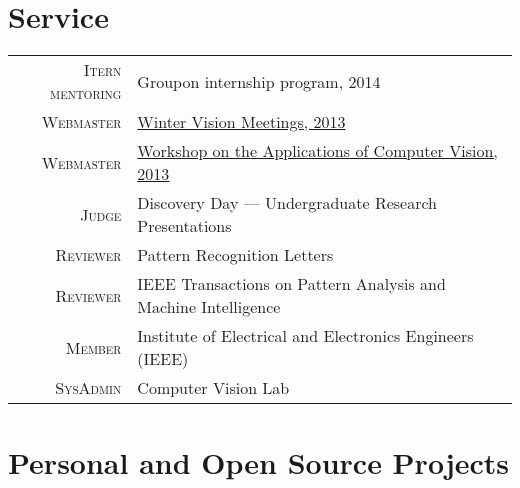 \documentclass[10pt]{article}
\begin{document}
\section{Service}
\vspace{-1em}
\newcommand{\service}[2]{
  \textsc{#1} & #2\\
}
\begin{longtable}{r|p{10cm}}
  \service{Itern mentoring}{Groupon internship program, 2014}
  \service{Webmaster}{\href{http://cvl.cse.sc.edu/wvm2013/}{Winter Vision Meetings, 2013}}
  \service{Webmaster}{\href{http://cvl.cse.sc.edu/wacv2013/}{Workshop on the Applications of Computer Vision, 2013}}
  \service{Judge}{Discovery Day --- Undergraduate Research Presentations}
  \service{Reviewer}{Pattern Recognition Letters}
  \service{Reviewer}{IEEE Transactions on Pattern Analysis and Machine Intelligence}
  \service{Member}{Institute of Electrical and Electronics Engineers (IEEE)}
  \service{SysAdmin}{Computer Vision Lab}
\end{longtable}


\section{Personal and Open Source Projects}
\newcommand{\proj}[3]{
  \textsc{#1} & #2\\
   &\href{http://www.#3}{#3}\\
   \multicolumn{2}{c}{} \\ [-1.5ex]
}

\newcommand{\projlh}[4]{
  \textsc{#1} & #2\\
   &\href{#3}{#4}\\
}
\end{document}
